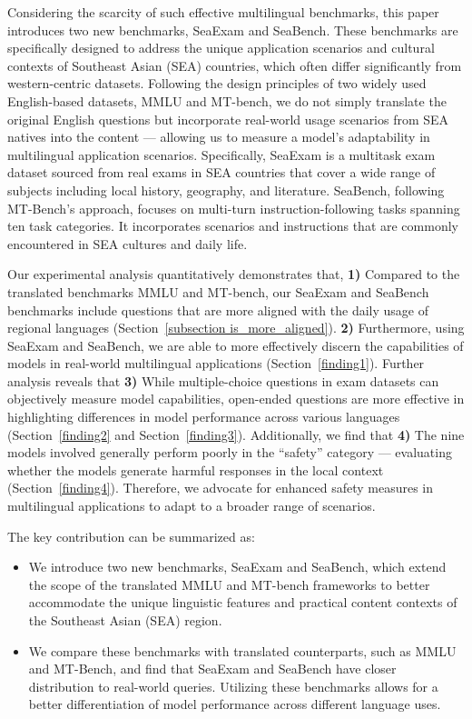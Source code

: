 Considering the scarcity of such effective multilingual benchmarks, this paper introduces two new benchmarks, SeaExam and SeaBench.
These benchmarks are specifically designed to address the unique application scenarios and cultural contexts of Southeast Asian (SEA) countries, which often differ significantly from western-centric datasets.
Following the design principles of two widely used English-based datasets, MMLU and MT-bench, we do not simply translate the original English questions but incorporate real-world usage scenarios from SEA natives into the content --- allowing us to measure a model's adaptability in multilingual application scenarios.
Specifically, SeaExam is a multitask exam dataset sourced from real exams in SEA countries that cover a wide range of subjects including local history, geography, and literature. 
SeaBench, following MT-Bench's approach, focuses on multi-turn instruction-following tasks spanning ten task categories. It incorporates scenarios and instructions that are commonly encountered in SEA cultures and daily life.


Our experimental analysis quantitatively demonstrates that, \textbf{1)} Compared to the translated benchmarks MMLU and MT-bench, our SeaExam and SeaBench benchmarks include questions that are more aligned with the daily usage of regional languages (Section~\ref{subsection is_more_aligned}). \textbf{2)} Furthermore, using SeaExam and SeaBench, we are able to more effectively discern the capabilities of models in real-world multilingual applications (Section~\ref{finding1}). Further analysis reveals that \textbf{3)} While multiple-choice questions in exam datasets can objectively measure model capabilities, open-ended questions are more effective in highlighting differences in model performance across various languages (Section~\ref{finding2} and Section~\ref{finding3}). Additionally, we find that \textbf{4)} The nine models involved generally perform poorly in the ``safety'' category --- evaluating whether the models generate harmful responses in the local context (Section~\ref{finding4}). Therefore, we advocate for enhanced safety measures in multilingual applications to adapt to a broader range of scenarios.

The key contribution can be summarized as:
\begin{itemize}
   \item We introduce two new benchmarks, SeaExam and SeaBench, which extend the scope of the translated MMLU and MT-bench frameworks to better accommodate the unique linguistic features and practical content contexts of the Southeast Asian (SEA) region.
    \item We compare these benchmarks with translated counterparts, such as MMLU and MT-Bench, and find that SeaExam and SeaBench have closer distribution to real-world queries. Utilizing these benchmarks allows for a better differentiation of model performance across different language uses. 
\end{itemize}




